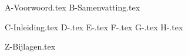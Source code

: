 \documentclass[10pt,a4paper,twoside]{report}
\begin{document}

{A-Voorwoord.tex}
{B-Samenvatting.tex}

\setcounter{page}{5} %
\tableofcontents
\thispagestyle{empty}

{C-Inleiding.tex}
{D-.tex}
{E-.tex}
{F-.tex}
{G-.tex}
{H-.tex}

\printbibliography
{}

{Z-Bijlagen.tex}
\end{document}
